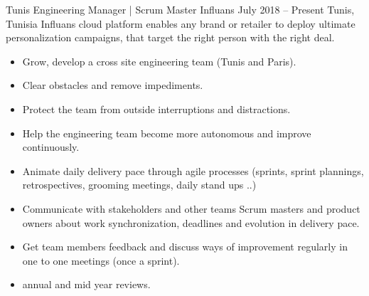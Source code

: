 \documentclass[10pt,a4paper]{resume-settings}
\begin{document}

\begin{fullwidth}
\makecvheader
\end{fullwidth}



\cvevent
    {Tunis Engineering Manager | Scrum Master}
    {Influans}
    {July 2018 -- Present}
    {Tunis, Tunisia}
    {Influans cloud platform enables any brand or retailer to deploy ultimate personalization campaigns, that target the right person with the right deal.}
    \begin{itemize}
         \item Grow, develop a cross site engineering team (Tunis and Paris).
        \item Clear obstacles and remove impediments.
        \item Protect the team from outside interruptions and distractions.
        \item Help the engineering team become more autonomous and improve continuously.
        \item Animate daily delivery pace through agile processes (sprints, sprint plannings, retrospectives, grooming meetings, daily stand ups ..)
        \item Communicate with stakeholders and other teams Scrum masters and product owners about work synchronization, deadlines and evolution in delivery pace.
        \item Get team members feedback and discuss ways of improvement regularly in one to one meetings (once a sprint).
        \item annual and mid year reviews.
    \end{itemize}
\divider
\end{document}
